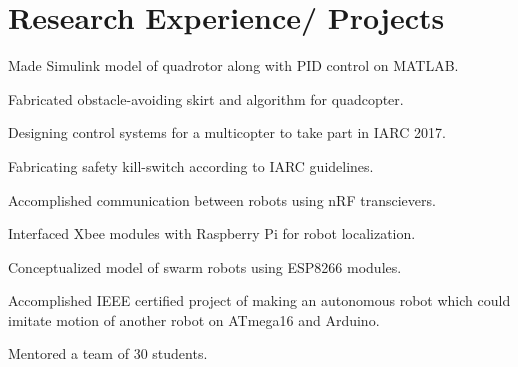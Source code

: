 \documentclass[letterpaper]{aman}
\begin{document}
\hfill
\begin{minipage}[t]{0.599\textwidth} 



\section{Research Experience/ Projects}

\vspace{\topsep}
\begin{tightemize}
\item Made Simulink model of quadrotor along with PID control on MATLAB.
\item Fabricated obstacle-avoiding skirt and algorithm for quadcopter.
\item Designing control systems for a multicopter to take part in IARC 2017.
\item Fabricating safety kill-switch according to IARC guidelines.
\end{tightemize}
\sectionsep

\begin{tightemize}
\item Accomplished communication between robots using nRF transcievers.
\item Interfaced Xbee modules with Raspberry Pi for robot localization.
\item Conceptualized model of swarm robots using ESP8266 modules.
\end{tightemize}
\sectionsep

\begin{tightemize}
\item Accomplished IEEE certified project of making an autonomous robot which could imitate motion of another robot on ATmega16 and Arduino.
\item Mentored a team of 30 students.
\end{tightemize}
\sectionsep


\end{minipage}
\end{document}
